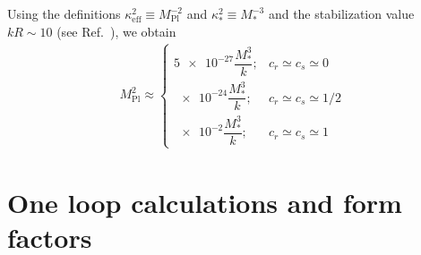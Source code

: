 \documentclass[twocolumn,showpacs,showkeys,prd,superscriptaddress]{revtex4-1}
\begin{document}

Using the definitions $\kappa_{\text{eff}}^2 \equiv M_{\text{Pl}}^{-2}$ and $\kappa_*^2 \equiv M_*^{-3}$ and the stabilization value $kR\sim10$ (see Ref.~\cite{Goldberger:1999uk}), we obtain %
\begin{align}
  M_{\text{Pl}}^2 \approx 
  \begin{cases}    
    \num{5e-27} \dfrac{M_*^3}{k};  & c_r\simeq c_s\simeq 0 \\[2ex]
    \num{e-24} \dfrac{M_*^3}{k};  & c_r\simeq c_s\simeq 1/2 \\[2ex]
    \num{e-2}\dfrac{M_*^3}{k};  & c_r\simeq c_s\simeq 1 
  \end{cases}
\end{align}





%

\section{\label{sec:oneloop}One loop calculations and form factors}
\end{document}
